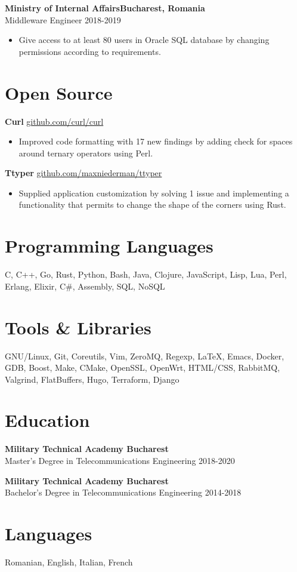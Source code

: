 \documentclass[a4paper,12pt]{article}
\begin{document}
\textbf{Ministry of Internal Affairs\hfill Bucharest, Romania}\\
Middleware Engineer \hfill 2018-2019 
\vspace{-3mm}
\begin{itemize}[noitemsep, leftmargin=4mm]
\item Give access to at least 80 users in Oracle SQL database by changing permissions according to requirements.
\end{itemize}

\section{Open Source}
\textbf{Curl} \hfill \href{https://github.com/curl/curl}{github.com/curl/curl}
\vspace{-3mm}
\begin{itemize}[noitemsep, leftmargin=4mm]
\item Improved code formatting with 17 new findings by adding check for spaces around ternary operators using Perl.
\end{itemize}

\textbf{Ttyper} \hfill \href{https://github.com/maxniederman/ttype}{github.com/maxniederman/ttyper}
\vspace{-3mm}
\begin{itemize}[noitemsep, leftmargin=4mm]
\item Supplied application customization by solving 1 issue and implementing a functionality that permits to change the shape of the corners using Rust.
\end{itemize}

  
\section{Programming Languages}
C, C++, Go, Rust, Python, Bash, Java, Clojure, JavaScript, 
Lisp, Lua, Perl, Erlang, Elixir, C\#, Assembly, SQL, NoSQL

\section{Tools \& Libraries}
GNU/Linux, Git, Coreutils, Vim, ZeroMQ, Regexp, \LaTeX, 
Emacs, Docker, GDB, Boost, Make, CMake, OpenSSL, OpenWrt, HTML/CSS, 
RabbitMQ, Valgrind, FlatBuffers, Hugo, Terraform, Django 

\section{Education}
\textbf{Military Technical Academy \hfill Bucharest}\\
Master's Degree in Telecommunications Engineering \hfill 2018-2020

\textbf{Military Technical Academy \hfill Bucharest}\\
Bachelor's Degree in Telecommunications Engineering \hfill 2014-2018

\section{Languages}
Romanian, English, Italian, French
\end{document}
